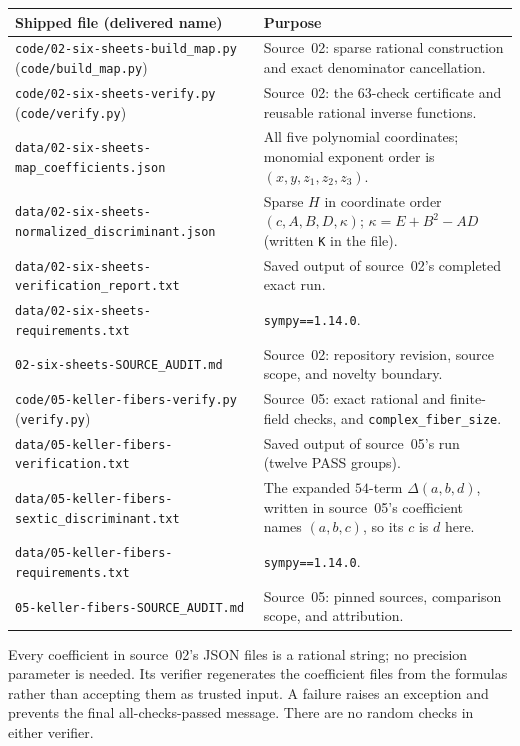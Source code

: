 \documentclass[11pt,a4paper]{article}
\theoremstyle{definition}
\newcommand{\kk}{\kappa}
\newcommand{\code}[1]{\texttt{\nolinkurl{#1}}}
\begin{document}
\begin{center}\small
\renewcommand{\arraystretch}{1.25}
\begin{tabularx}{\textwidth}{@{}>{\raggedright\arraybackslash}p{}X@{}}
\toprule
Shipped file (delivered name) & Purpose\\
\midrule
\code{code/02-six-sheets-build_map.py} (\code{code/build_map.py}) & Source~02: sparse rational construction and exact denominator cancellation.\\
\code{code/02-six-sheets-verify.py} (\code{code/verify.py}) & Source~02: the 63-check certificate and reusable rational inverse functions.\\
\code{data/02-six-sheets-map_coefficients.json} & All five polynomial coordinates; monomial exponent order is $(x,y,z_1,z_2,z_3)$.\\
\code{data/02-six-sheets-normalized_discriminant.json} & Sparse $H$ in coordinate order $(c,A,B,D,\kk)$; $\kk=E+B^2-AD$ (written \code{K} in the file).\\
\code{data/02-six-sheets-verification_report.txt} & Saved output of source~02's completed exact run.\\
\code{data/02-six-sheets-requirements.txt} & \code{sympy==1.14.0}.\\
\code{02-six-sheets-SOURCE_AUDIT.md} & Source~02: repository revision, source scope, and novelty boundary.\\
\code{code/05-keller-fibers-verify.py} (\code{verify.py}) & Source~05: exact rational and finite-field checks, and \code{complex_fiber_size}.\\
\code{data/05-keller-fibers-verification.txt} & Saved output of source~05's run (twelve PASS groups).\\
\code{data/05-keller-fibers-sextic_discriminant.txt} & The expanded $54$-term $\Delta(a,b,d)$, written in source~05's coefficient names $(a,b,c)$, so its $c$ is $d$ here.\\
\code{data/05-keller-fibers-requirements.txt} & \code{sympy==1.14.0}.\\
\code{05-keller-fibers-SOURCE_AUDIT.md} & Source~05: pinned sources, comparison scope, and attribution.\\
\bottomrule
\end{tabularx}
\end{center}

Every coefficient in source~02's JSON files is a rational string; no
precision parameter is needed. Its verifier regenerates the coefficient files
from the formulas rather than accepting them as trusted input. A failure
raises an exception and prevents the final all-checks-passed message. There
are no random checks in either verifier.
\end{document}
